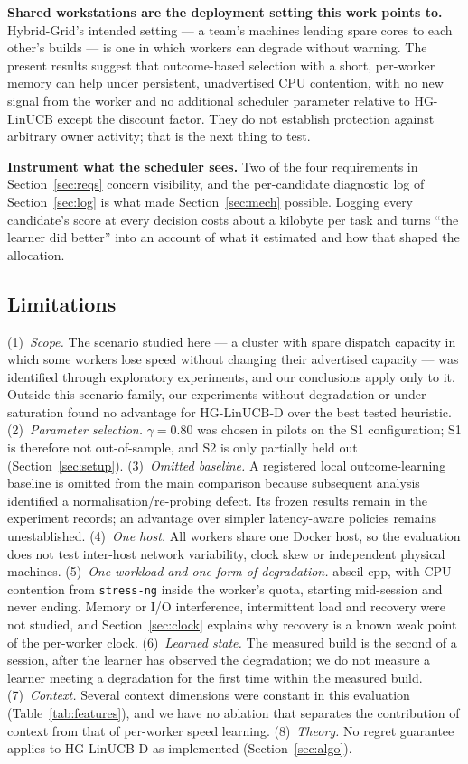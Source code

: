 \documentclass[final,5p,times,twocolumn]{elsarticle}
\begin{document}
\textbf{Shared workstations are the deployment setting this work points to.} Hybrid-Grid's intended setting --- a team's machines lending spare cores to each other's builds --- is one in which workers can degrade without warning. The present results suggest that outcome-based selection with a short, per-worker memory can help under persistent, unadvertised CPU contention, with no new signal from the worker and no additional scheduler parameter relative to HG-LinUCB except the discount factor. They do not establish protection against arbitrary owner activity; that is the next thing to test.

\textbf{Instrument what the scheduler sees.} Two of the four requirements in Section~\ref{sec:reqs} concern visibility, and the per-candidate diagnostic log of Section~\ref{sec:log} is what made Section~\ref{sec:mech} possible. Logging every candidate's score at every decision costs about a kilobyte per task and turns ``the learner did better'' into an account of what it estimated and how that shaped the allocation.

\subsection{Limitations}
\label{sec:limitations}

(1)~\emph{Scope.} The scenario studied here --- a cluster with spare dispatch capacity in which some workers lose speed without changing their advertised capacity --- was identified through exploratory experiments, and our conclusions apply only to it. Outside this scenario family, our experiments without degradation or under saturation found no advantage for HG-LinUCB-D over the best tested heuristic. (2)~\emph{Parameter selection.} $\gamma=0.80$ was chosen in pilots on the S1 configuration; S1 is therefore not out-of-sample, and S2 is only partially held out (Section~\ref{sec:setup}). (3)~\emph{Omitted baseline.} A registered local outcome-learning baseline is omitted from the main comparison because subsequent analysis identified a normalisation/re-probing defect. Its frozen results remain in the experiment records; an advantage over simpler latency-aware policies remains unestablished. (4)~\emph{One host.} All workers share one Docker host, so the evaluation does not test inter-host network variability, clock skew or independent physical machines. (5)~\emph{One workload and one form of degradation.} abseil-cpp, with CPU contention from \texttt{stress-ng} inside the worker's quota, starting mid-session and never ending. Memory or I/O interference, intermittent load and recovery were not studied, and Section~\ref{sec:clock} explains why recovery is a known weak point of the per-worker clock. (6)~\emph{Learned state.} The measured build is the second of a session, after the learner has observed the degradation; we do not measure a learner meeting a degradation for the first time within the measured build. (7)~\emph{Context.} Several context dimensions were constant in this evaluation (Table~\ref{tab:features}), and we have no ablation that separates the contribution of context from that of per-worker speed learning. (8)~\emph{Theory.} No regret guarantee applies to HG-LinUCB-D as implemented (Section~\ref{sec:algo}).
\end{document}
